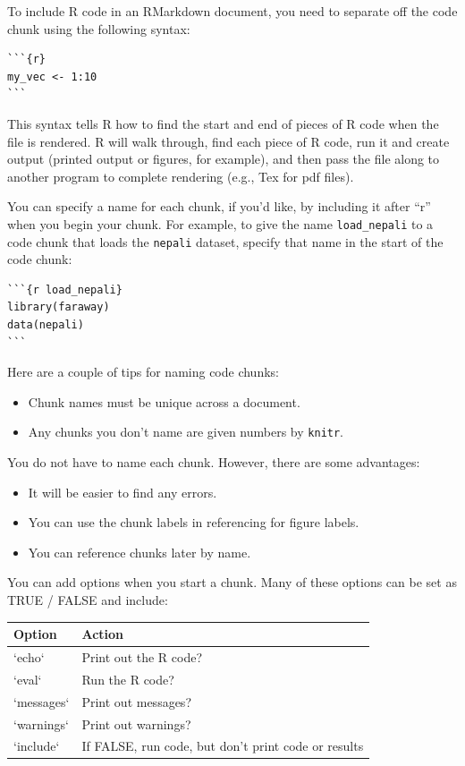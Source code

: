 \documentclass[]{book}
\providecommand{\tightlist}{%
  \setlength{\itemsep}{0pt}\setlength{\parskip}{0pt}}
\begin{document}
To include R code in an RMarkdown document, you need to separate off the
code chunk using the following syntax:

\begin{verbatim}
```{r}
my_vec <- 1:10
```
\end{verbatim}

This syntax tells R how to find the start and end of pieces of R code
when the file is rendered. R will walk through, find each piece of R
code, run it and create output (printed output or figures, for example),
and then pass the file along to another program to complete rendering
(e.g., Tex for pdf files).

You can specify a name for each chunk, if you'd like, by including it
after ``r'' when you begin your chunk. For example, to give the name
\texttt{load\_nepali} to a code chunk that loads the \texttt{nepali}
dataset, specify that name in the start of the code chunk: \bigskip

\begin{verbatim}
```{r load_nepali}
library(faraway)
data(nepali)
```
\end{verbatim}

Here are a couple of tips for naming code chunks:

\begin{itemize}
\tightlist
\item
  Chunk names must be unique across a document.
\item
  Any chunks you don't name are given numbers by \texttt{knitr}.
\end{itemize}

You do not have to name each chunk. However, there are some advantages:

\begin{itemize}
\tightlist
\item
  It will be easier to find any errors.\\
\item
  You can use the chunk labels in referencing for figure labels.
\item
  You can reference chunks later by name.
\end{itemize}

You can add options when you start a chunk. Many of these options can be
set as TRUE / FALSE and include:

\begin{tabular}{l|l}
\hline
Option & Action\\
\hline
`echo` & Print out the R code?\\
\hline
`eval` & Run the R code?\\
\hline
`messages` & Print out messages?\\
\hline
`warnings` & Print out warnings?\\
\hline
`include` & If FALSE, run code, but don't print code or results\\
\hline
\end{tabular}
\end{document}
